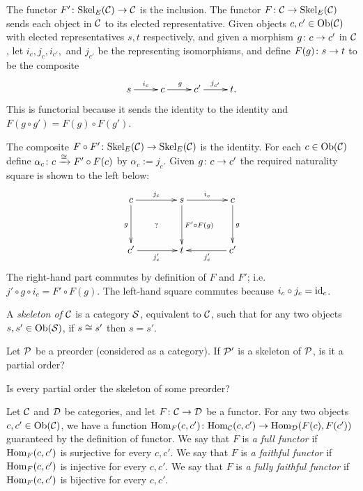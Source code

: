 \documentclass[CT4S-EN-RU]{subfiles}
\begin{document}
\begin{proofENG}
The functor $F'\colon\textnormal{Skel}_E(\mathcal{C})\rightarrow\mathcal{C}$ is the inclusion. The functor $F\colon\mathcal{C}\rightarrow\textnormal{Skel}_E(\mathcal{C})$ sends each object in $\mathcal{C}$ to its elected representative. Given objects $c,c'\in\textnormal{Ob}(\mathcal{C})$ with elected representatives $s,t$ respectively, and given a morphism $g\colon c\rightarrow c'$ in $\mathcal{C}$, let $i_c,j_c,i_{c'},$ and $j_{c'}$ be the representing isomorphisms, and define $F(g)\colon s\rightarrow t$ to be the composite 
$$\xymatrix{s\ar[r]^{i_c}&c\ar[r]^g&c'\ar[r]^{j_{c'}}&t.}$$
This is functorial because it sends the identity to the identity and $F(g\circ g')=F(g)\circ F(g')$.

The composite $F\circ F'\colon\textnormal{Skel}_E(\mathcal{C})\rightarrow\textnormal{Skel}_E(\mathcal{C})$ is the identity. For each $c\in\textnormal{Ob}(\mathcal{C})$ define $\alpha_c\colon c\xrightarrow{\cong} F'\circ F(c)$ by  $\alpha_c:=j_c$. Given $g\colon c\rightarrow c'$ the required naturality square is shown to the left below:
$$
\xymatrix@=40pt{
c\ar[r]^{j_c}\ar[d]_{g}\ar@{}[dr]|{?}&s\ar[r]^{i_c}\ar[d]^{F'\circ F(g)}&c\ar[d]^g\\
c'\ar[r]_{j_c'}&t&c'\ar[l]^{j_c'}}
$$
The right-hand part commutes by definition of $F$ and $F'$; i.e. $j'\circ g\circ i_c=F'\circ F(g)$. The left-hand square commutes because $i_c\circ j_c=\textnormal{id}_c$.
\end{proofENG}

\begin{proofRUS}
\end{proofRUS}

\begin{definitionENG}
A {\em skeleton of $\mathcal{C}$} is a category $\mathcal{S}$, equivalent to $\mathcal{C}$, such that for any two objects $s,s'\in\textnormal{Ob}(\mathcal{S})$, if $s\cong s'$ then $s=s'$. 
\end{definitionENG}

\begin{definitionRUS}
\end{definitionRUS}

\begin{exerciseENG}
Let $\mathcal{P}$ be a preorder (considered as a category).
\sexc If $\mathcal{P}'$ is a skeleton of $\mathcal{P}$, is it a partial order?
\item Is every partial order the skeleton of some preorder?
\endsexc
\end{exerciseENG}

\begin{exerciseRUS}
\end{exerciseRUS}

\begin{definitionENG}\label{def:full faithful}
Let $\mathcal{C}$ and $\mathcal{D}$ be categories, and let $F\colon\mathcal{C}\rightarrow\mathcal{D}$ be a functor. For any two objects $c,c'\in\textnormal{Ob}(\mathcal{C})$, we have a function $\textnormal{Hom}_F(c,c')\colon\textnormal{Hom}_\mathcal{C}(c,c')\rightarrow\textnormal{Hom}_\mathcal{D}(F(c),F(c'))$ guaranteed by the definition of functor.
We say that $F$ is {\em a full functor} if $\textnormal{Hom}_F(c,c')$ is surjective for every $c,c'$.
We say that $F$ is {\em a faithful functor} if $\textnormal{Hom}_F(c,c')$ is injective for every $c,c'$. We say that $F$ is {\em a fully faithful functor} if $\textnormal{Hom}_F(c,c')$ is bijective for every $c,c'$.
\end{definitionENG}
\end{document}

